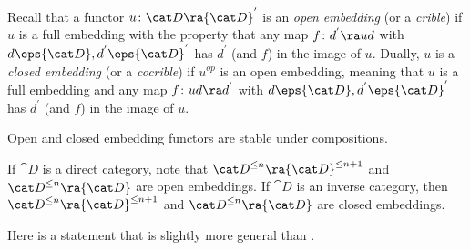Recall that a functor $u \colon {\cat D} \ra {\cat D}^{'}$ is an {\it open embedding} (or a {\it crible})  if $u$ is a full embedding with the property that any map $f \colon d^{'} \ra ud$ with $d \eps {\cat D}, d^{'} \eps {\cat D}^{'}$ has $d^{'}$ (and $f$) in the image of $u$. Dually, $u$ is a {\it closed embedding} (or a {\it cocrible})  if $u^{op}$ is an open embedding, meaning that $u$ is a full embedding and any map $f \colon ud \ra d^{'}$ with $d \eps {\cat D}, d^{'} \eps {\cat D}^{'}$ has $d^{'}$ (and $f$) in the image of $u$.

Open and closed embedding functors are stable under compositions. 

If ${\cat D}$ is a direct category, note that ${\cat D}^{\le n} \ra {\cat D}^{\le n+1}$ and ${\cat D}^{\le n} \ra {\cat D}$ are open embeddings. If ${\cat D}$ is an inverse category, then ${\cat D}^{\le n} \ra {\cat D}^{\le n+1}$ and ${\cat D}^{\le n} \ra {\cat D}$ are closed embeddings.

Here is a statement that is slightly more general than .

